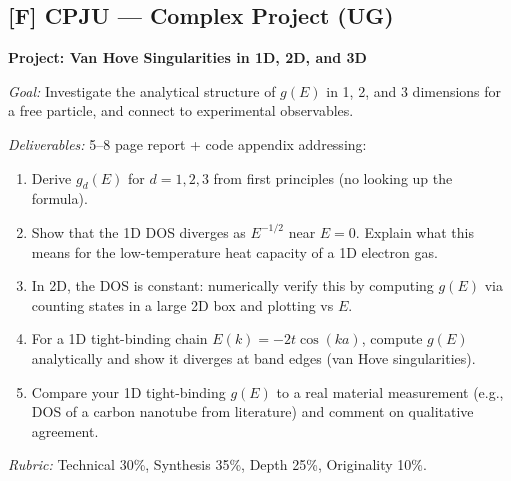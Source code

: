 \subsection*{[F] CPJU — Complex Project (UG)}
\begin{tcolorbox}[ugprobbox, title={CPJU · L01 · Tier 3 · 8–15 hrs}]
\textbf{Project: Van Hove Singularities in 1D, 2D, and 3D}

\textit{Goal:} Investigate the analytical structure of $g(E)$ in 1, 2, and 3 dimensions
for a free particle, and connect to experimental observables.

\textit{Deliverables:} 5–8 page report + code appendix addressing:
\begin{enumerate}[topsep=2pt]
  \item Derive $g_d(E)$ for $d = 1, 2, 3$ from first principles (no looking up the formula).
  \item Show that the 1D DOS diverges as $E^{-1/2}$ near $E=0$. Explain what this means
    for the low-temperature heat capacity of a 1D electron gas.
  \item In 2D, the DOS is constant: numerically verify this by computing $g(E)$ via
    counting states in a large 2D box and plotting vs $E$.
  \item For a 1D tight-binding chain $E(k) = -2t\cos(ka)$, compute $g(E)$ analytically
    and show it diverges at band edges (van Hove singularities).
  \item Compare your 1D tight-binding $g(E)$ to a real material measurement (e.g., DOS
    of a carbon nanotube from literature) and comment on qualitative agreement.
\end{enumerate}
\textit{Rubric:} Technical 30\%, Synthesis 35\%, Depth 25\%, Originality 10\%.
\end{tcolorbox}

